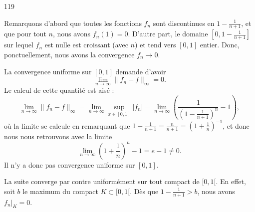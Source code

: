 

\begin{corrige}{119}



	Remarquons d'abord que toutes les fonctions $f_{n}$ sont discontinues en $1-\frac{1}{ n+1 }$, et que pour tout $n$, nous avons $f_n(1)=0$. D'autre part, le domaine $[0,1-\frac{1}{ n+1 }]$ sur lequel $f_n$ est nulle est croissant (avec $n$) et tend vers $[0,1]$ entier. Donc, ponctuellement, nous avons la convergence $f_n\to 0$.

	La convergence uniforme sur $[0,1]$ demande d'avoir
	\begin{equation}
		\lim_{n\to\infty}\| f_n-f \|_{\infty}=0.
	\end{equation}
	Le calcul de cette quantité est aisé :
	\begin{equation}
		\lim_{n\to\infty}\| f_n-f \|_{\infty}=\lim_{n\to\infty}\sup_{x\in[0,1]}| f_n |=\lim_{n\to\infty}\left( \frac{1}{ \left( 1-\frac{ 1 }{ n+1 } \right)^n }-1 \right),
	\end{equation}
	où la limite se calcule en remarquant que $1-\frac{ 1 }{ n+1 }=\frac{ n }{ n+1 }=\left( 1+\frac{ 1 }{ n }\right)^{-1}$, et donc nous nous retrouvons avec la limite
	\begin{equation}
		\lim_{n\to\infty}\left( 1+\frac{1}{ n } \right)^n-1=e-1\neq 0.
	\end{equation}
	Il n'y a donc pas convergence uniforme sur $[0,1]$.

	La suite converge par contre uniformément sur tout compact de $[0,1[$. En effet, soit $b$ le maximum du compact $K\subset[0,1[$. Dès que $1-\frac{ 1 }{ n+1 }>b$, nous avons $f_{n}|_{K}=0$.

\end{corrige}
